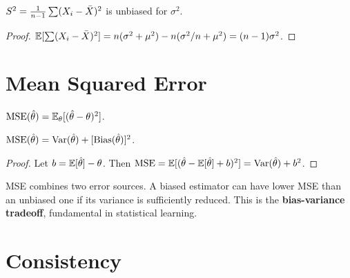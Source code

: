 \begin{proposition}
$S^2=\frac{1}{n-1}\sum(X_i-\bar{X})^2$ is unbiased for $\sigma^2$.
\end{proposition}

\begin{proof}
$\mathbb{E}[\sum(X_i-\bar{X})^2]=n(\sigma^2+\mu^2)-n(\sigma^2/n+\mu^2)=(n-1)\sigma^2$.
\end{proof}

\section{Mean Squared Error}

\begin{definition}[MSE]
$\operatorname{MSE}(\hat{\theta}) = \mathbb{E}_\theta[(\hat{\theta}-\theta)^2]$.
\end{definition}

\begin{theorem}
\label{thm:bias-variance}
$\operatorname{MSE}(\hat{\theta}) = \operatorname{Var}(\hat{\theta}) + [\operatorname{Bias}(\hat{\theta})]^2$.
\end{theorem}

\begin{proof}
Let $b=\mathbb{E}[\hat{\theta}]-\theta$. Then $\operatorname{MSE} = \mathbb{E}[(\hat{\theta}-\mathbb{E}[\hat{\theta}]+b)^2] = \operatorname{Var}(\hat{\theta})+b^2$.
\end{proof}

\begin{intuition}
MSE combines two error sources. A biased estimator can have lower MSE than an unbiased one if its variance is sufficiently reduced. This is the \textbf{bias-variance tradeoff}, fundamental in statistical learning.
\end{intuition}

\begin{center}
\end{center}

\section{Consistency}

